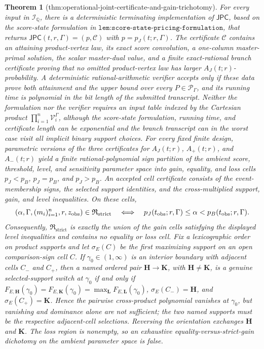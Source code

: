 \documentclass{article}
\newtheorem{theorem}{Theorem}
\begin{document}
\begin{theorem}[thm:operational-joint-certificate-and-gain-trichotomy]\label{thm:operational-joint-certificate-and-gain-trichotomy}
For every input in \(\mathcal I_{\mathbb Q}\), there is a deterministic terminating implementation of \(\mathsf{JPC}\), based on the score-state formulation in \(\texttt{lem:score-state-pricing-formulation}\), that returns \(\mathsf{JPC}(t,r,\Gamma)=(p,\mathcal C)\) with \(p=p_J(t;r,\Gamma)\). The certificate \(\mathcal C\) contains an attaining product-vertex law, its exact score convolution, a one-column master-primal solution, the scalar master-dual value, and a finite exact-rational branch certificate proving that no omitted product-vertex law has larger \(A_J(t;r)\)-probability. A deterministic rational-arithmetic verifier accepts only if these data prove both attainment and the upper bound over every \(P\in\mathcal P_\Gamma\), and its running time is polynomial in the bit length of the submitted transcript. Neither the formulation nor the verifier requires an input table indexed by the Cartesian product \(\prod_{i=1}^n\mathcal V_i^\Gamma\), although the score-state formulation, running time, and certificate length can be exponential and the branch transcript can in the worst case visit all implicit binary support choices. For every fixed finite design, parametric versions of the three certificates for \(A_J(t;r)\), \(A_+(t;r)\), and \(A_-(t;r)\) yield a finite rational-polynomial sign partition of the ambient score, threshold, level, and sensitivity parameter space into gain, equality, and loss cells \(p_J<p_B\), \(p_J=p_B\), and \(p_J>p_B\). An accepted cell certificate consists of the event-membership signs, the selected support identities, and the cross-multiplied support, gain, and level inequalities. On these cells, \[
\makebox[\linewidth][c]{\resizebox{0.98\linewidth}{!}{\par\noindent \makebox[\linewidth][c]{\resizebox{0.98\linewidth}{!}{\(\displaystyle \displaystyle (\alpha,\Gamma,(m_i)_{i=1}^n,r,z_{\mathrm{obs}})\in\mathfrak R_{\mathrm{strict}}\quad\Longleftrightarrow\quad p_J(t_{\mathrm{obs}};r,\Gamma)\le\alpha<p_B(t_{\mathrm{obs}};r,\Gamma).\)}}\par\noindent}}
\] Consequently, \(\mathfrak R_{\mathrm{strict}}\) is exactly the union of the gain cells satisfying the displayed level inequalities and contains no equality or loss cell. Fix a lexicographic order on product supports and let \(\sigma_E(C)\) be the first maximizing support on an open comparison-sign cell \(C\). If \(\gamma_0\in(1,\infty)\) is an interior boundary with adjacent cells \(C_-\) and \(C_+\), then a named ordered pair \(\mathbf H\to\mathbf K\), with \(\mathbf H\ne\mathbf K\), is a genuine selected-support switch at \(\gamma_0\) if and only if \(F_{E,\mathbf H}(\gamma_0)=F_{E,\mathbf K}(\gamma_0)=\max_{\mathbf L}F_{E,\mathbf L}(\gamma_0)\), \(\sigma_E(C_-)=\mathbf H\), and \(\sigma_E(C_+)=\mathbf K\). Hence the pairwise cross-product polynomial vanishes at \(\gamma_0\), but vanishing and dominance alone are not sufficient; the two named supports must be the respective adjacent-cell selections. Reversing the orientation exchanges \(\mathbf H\) and \(\mathbf K\). The loss region is nonempty, so an exhaustive equality-versus-strict-gain dichotomy on the ambient parameter space is false.

\end{theorem}
\end{document}
